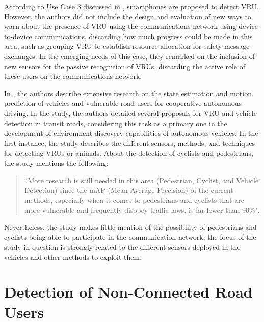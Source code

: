 According to Use Case 3 discussed in \cite{hakeem20205g}, smartphones are proposed to detect VRU. However, the authors did not include the design and evaluation of new ways to warn about the presence of VRU using the communications network using device-to-device communications, discarding how much progress could be made in this area, such as grouping VRU to establish resource allocation for safety message exchanges. In the emerging needs of this case, they remarked on the inclusion of new sensors for the passive recognition of VRUs, discarding the active role of these users on the communications network.

In \cite{Ghorai2022}, the authors describe extensive research on the state estimation and motion prediction of vehicles and vulnerable road users for cooperative autonomous driving. In the study, the authors detailed several proposals for VRU and vehicle detection in transit roads, considering this task as a primary one in the development of environment discovery capabilities of autonomous vehicles. In the first instance, the study describes the different sensors, methods, and techniques for detecting VRUs or animals. About the detection of cyclists and pedestrians, the study mentions the following:

\begin{quote}
``More research is still needed in this area (Pedestrian, Cyclist, and Vehicle Detection) since the mAP (Mean Average Precision) of the current methods, especially when it comes to pedestrians and cyclists that are more vulnerable and frequently disobey traffic laws, is far lower than 90\%".
\end{quote}

Nevertheless, the study makes little mention of the possibility of pedestrians and cyclists being able to participate in the communication network; the focus of the study in question is strongly related to the different sensors deployed in the vehicles and other methods to exploit them.


\section{Detection of Non-Connected Road Users}

